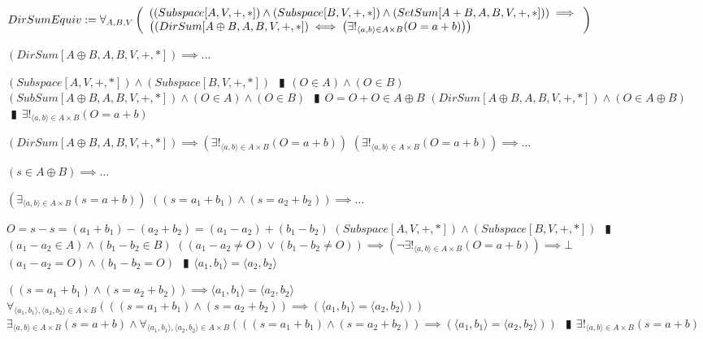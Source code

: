 \documentclass{book}
\newcommand{\abr}{:=}
\newcommand{\pipe}{$\phantom{(}\vrectangleblack\phantom{)}$}
\newcommand{\pr}[1]{\left(#1\right)}
\begin{document}
\begin{shaded}
$DirSumEquiv \abr \forall_{A, B, V}\left(\begin{array}{ll}
  \pr{(Subspace[A, V, +, *]) \land (Subspace[B, V, +, *]) \land (SetSum[A + B, A, B, V, +, *])} \hfill \implies \hfill \\
  \pr{(DirSum[A \oplus B, A, B, V, +, *]) \iff \pr{\exists!_{\langle a, b \rangle \in A \times B}(O = a + b)}}
\end{array}\right)$
\begin{enumerate}
  \lit $(DirSum[A \oplus B, A, B, V, +, *]) \implies \ldots$
  \begin{enumerate}
    \lit $(Subspace[A, V, +, *]) \land (Subspace[B, V, +, *])$ \pipe $(O \in A) \land (O \in B)$
    \lit $(SubSum[A \oplus B, A, B, V, +, *]) \land (O \in A) \land (O \in B)$ \pipe $O = O + O \in A \oplus B$
    \lit $(DirSum[A \oplus B, A, B, V, +, *]) \land (O \in A \oplus B)$ \pipe $\exists!_{\langle a, b \rangle \in A \times B}(O = a + b)$
  \end{enumerate}
  \lit $(DirSum[A \oplus B, A, B, V, +, *]) \implies \pr{\exists!_{\langle a, b \rangle \in A \times B}(O = a + b)}$
  \lit $\pr{\exists!_{\langle a, b \rangle \in A \times B}(O = a + b)} \implies \ldots$
  \begin{enumerate}
    \lit $(s \in A \oplus B) \implies \ldots$
    \begin{enumerate}
      \lit $\pr{\exists_{\langle a, b \rangle \in A \times B}(s = a + b)}$
      \lit $\pr{(s = a_1 + b_1) \land (s = a_2 + b_2)} \implies \ldots$
      \begin{enumerate}
        \lit $O = s - s = (a_1 + b_1) - (a_2 + b_2) = (a_1 - a_2) + (b_1 - b_2)$
        \lit $(Subspace[A, V, +, *]) \land (Subspace[B, V, +, *])$ \pipe $(a_1 - a_2 \in A) \land (b_1 - b_2 \in B)$
        \lit $\pr{(a_1 - a_2 \neq O) \lor (b_1 - b_2 \neq O)} \implies \pr{\lnot \exists!_{\langle a, b \rangle \in A \times B}(O = a + b)} \implies \bot$
        \lit $(a_1 - a_2 = O) \land (b_1 - b_2 = O)$ \pipe $\langle a_1, b_1 \rangle = \langle a_2, b_2 \rangle$
      \end{enumerate}
      \lit $\pr{(s = a_1 + b_1) \land (s = a_2 + b_2)} \implies \langle a_1, b_1 \rangle = \langle a_2, b_2 \rangle$
      \lit $\forall_{\langle a_1, b_1 \rangle, \langle a_2, b_2 \rangle \in A \times B}\pr{\pr{(s = a_1 + b_1) \land (s = a_2 + b_2)} \implies (\langle a_1, b_1 \rangle = \langle a_2, b_2 \rangle)}$
      \lit $\exists_{\langle a, b \rangle \in A \times B}(s = a + b) \land \forall_{\langle a_1, b_1 \rangle, \langle a_2, b_2 \rangle \in A \times B}\pr{\pr{(s = a_1 + b_1) \land (s = a_2 + b_2)} \implies (\langle a_1, b_1 \rangle = \langle a_2, b_2 \rangle)}$ \pipe $\exists!_{\langle a, b \rangle \in A \times B}(s = a + b)$

\end{enumerate}
\end{enumerate}
\end{enumerate}
\end{shaded}
\end{document}
